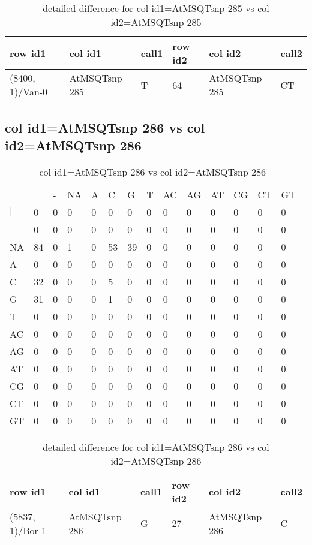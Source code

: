 \begin{center}
\begin{longtable}{|l|l|l|l|l|l|}
\caption{detailed difference for col id1=AtMSQTsnp 285 vs col id2=AtMSQTsnp 285} \label{table_dm633}\\
\hline
row id1&col id1&call1&row id2&col id2&call2\\
\hline
(8400, 1)/Van-0&AtMSQTsnp 285&T&64&AtMSQTsnp 285&CT\\
\hline
\end{longtable}
\end{center}

\subsection{col id1=AtMSQTsnp 286 vs col id2=AtMSQTsnp 286}
\begin{center}
\begin{longtable}{|l|l|l|l|l|l|l|l|l|l|l|l|l|l|}
\caption{col id1=AtMSQTsnp 286 vs col id2=AtMSQTsnp 286} \label{table_dm634}\\
\hline
\\
\hline
&$|$&-&NA&A&C&G&T&AC&AG&AT&CG&CT&GT\\
$|$&0&0&0&0&0&0&0&0&0&0&0&0&0\\
-&0&0&0&0&0&0&0&0&0&0&0&0&0\\
NA&84&0&1&0&53&39&0&0&0&0&0&0&0\\
A&0&0&0&0&0&0&0&0&0&0&0&0&0\\
C&32&0&0&0&5&0&0&0&0&0&0&0&0\\
G&31&0&0&0&1&0&0&0&0&0&0&0&0\\
T&0&0&0&0&0&0&0&0&0&0&0&0&0\\
AC&0&0&0&0&0&0&0&0&0&0&0&0&0\\
AG&0&0&0&0&0&0&0&0&0&0&0&0&0\\
AT&0&0&0&0&0&0&0&0&0&0&0&0&0\\
CG&0&0&0&0&0&0&0&0&0&0&0&0&0\\
CT&0&0&0&0&0&0&0&0&0&0&0&0&0\\
GT&0&0&0&0&0&0&0&0&0&0&0&0&0\\
\hline
\end{longtable}
\end{center}

\begin{center}
\begin{longtable}{|l|l|l|l|l|l|}
\caption{detailed difference for col id1=AtMSQTsnp 286 vs col id2=AtMSQTsnp 286} \label{table_dm635}\\
\hline
row id1&col id1&call1&row id2&col id2&call2\\
\hline
(5837, 1)/Bor-1&AtMSQTsnp 286&G&27&AtMSQTsnp 286&C\\
\hline
\end{longtable}
\end{center}

